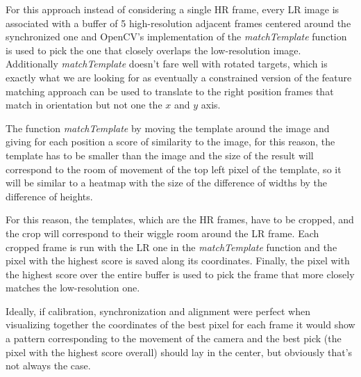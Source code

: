 For this approach instead of considering a single HR frame, every LR image is associated with a buffer of 5 high-resolution adjacent frames centered around the synchronized one and OpenCV's implementation of the \emph{matchTemplate} function is used to pick the one that closely overlaps the low-resolution image. Additionally \emph{matchTemplate} doesn't fare well with rotated targets, which is exactly what we are looking for as eventually a constrained version of the feature matching approach can be used to translate to the right position frames that match in orientation but not one the \(x\) and \(y\) axis.\newline

The function \emph{matchTemplate} by moving the template around the image and giving for each position a score of similarity to the image, for this reason, the template has to be smaller than the image and the size of the result will correspond to the room of movement of the top left pixel of the template, so it will be similar to a heatmap with the size of the difference of widths by the difference of heights.

For this reason, the templates, which are the HR frames, have to be cropped, and the crop will correspond to their wiggle room around the LR frame. Each cropped frame is run with the LR one in the \emph{matchTemplate} function and the pixel with the highest score is saved along its coordinates. Finally, the pixel with the highest score over the entire buffer is used to pick the frame that more closely matches the low-resolution one.

Ideally, if calibration, synchronization and alignment were perfect when visualizing together the coordinates of the best pixel for each frame it would show a pattern corresponding to the movement of the camera and the best pick (the pixel with the highest score overall) should lay in the center, but obviously that's not always the case.

